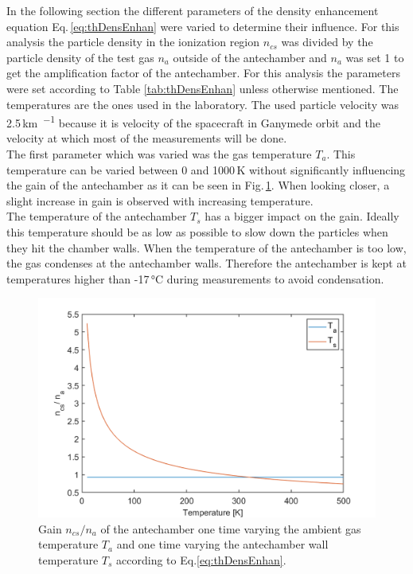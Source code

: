 		In the following section the different parameters of the density enhancement equation Eq.\,\eqref{eq:thDensEnhan} were varied to determine their influence. For this analysis the particle density in the ionization region $n_{cs}$ was divided by the particle density of the test gas $n_a$ outside of the antechamber and $n_a$ was set 1 to get the amplification factor of the antechamber. For this analysis the parameters were set according to Table \ref{tab:thDensEnhan} unless otherwise mentioned. The temperatures are the ones used in the laboratory. The used particle velocity was 2.5\,\si{\kilo\meter\per\sec} because it is velocity of the spacecraft in Ganymede orbit and the velocity at which most of the measurements will be done.\\
		
		The first parameter which was varied was the gas temperature $T_a$. This temperature can be varied between 0 and 1000\,\si{\kelvin} without significantly influencing the gain of the antechamber as it can be seen in Fig.\,\ref{th:densEnhTaTs}. When looking closer, a slight increase in gain is observed with increasing temperature.\\
		The temperature of the antechamber $T_s$ has a bigger impact on the gain. Ideally this temperature should be as low as possible to slow down the particles when they hit the chamber walls. When the temperature of the antechamber is too low, the gas condenses at the antechamber walls. Therefore the antechamber is kept at temperatures higher than -17\,\si{\degreeCelsius} during measurements to avoid condensation.\\
		\begin{figure}[h!] %
			\centering
			\includegraphics[width= .7\textwidth]{Bilder/Ta_Ts.png}
			\caption{Gain $n_{cs}/n_a$ of the antechamber one time varying the ambient gas temperature $T_a$ and one time varying the antechamber wall temperature $T_s$ according to Eq.\eqref{eq:thDensEnhan}.}
			\label{th:densEnhTaTs}
		\end{figure}
